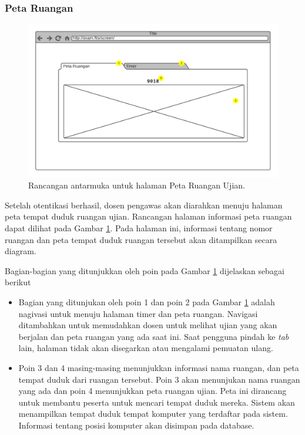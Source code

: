 \subsubsection{Peta Ruangan}
    \begin{figure}
        \centering
        \includegraphics[width=0.7\paperwidth]{Gambar/mockups/Mockup--DosenPengawas - Seatmap.pdf}
        \caption{Rancangan antarmuka untuk halaman Peta Ruangan Ujian.}
        \label{fig:mockup_dosen_seatmap}
    \end{figure}
    Setelah otentikasi berhasil, dosen pengawas akan diarahkan menuju halaman
    peta tempat duduk ruangan ujian. Rancangan halaman informasi peta ruangan
    dapat dilihat pada Gambar \ref{fig:mockup_dosen_seatmap}. Pada halaman ini,
    informasi tentang nomor ruangan dan peta tempat duduk ruangan tersebut akan
    ditampilkan secara diagram.
    
    Bagian-bagian yang ditunjukkan oleh poin pada Gambar
    \ref{fig:mockup_dosen_seatmap} dijelaskan sebagai berikut
    \begin{itemize}
        \item Bagian yang ditunjukan oleh poin 1 dan poin 2 pada Gambar
            \ref{fig:mockup_dosen_seatmap} adalah nagivasi untuk menuju halaman
            timer dan peta ruangan. Navigasi ditambahkan untuk memudahkan dosen
            untuk melihat ujian yang akan berjalan dan peta ruangan yang ada
            saat ini. Saat pengguna pindah ke \textit{tab} lain, halaman tidak
            akan disegarkan atau mengalami pemuatan ulang. 
            
        \item Poin 3 dan 4 masing-masing menunjukkan informasi nama ruangan, dan
            peta tempat duduk dari ruangan tersebut. Poin 3 akan menunjukan nama
            ruangan yang ada dan poin 4 menunjukkan peta ruangan ujian. Peta ini
            dirancang untuk membantu peserta untuk mencari tempat duduk mereka.
            Sistem akan menampilkan tempat duduk tempat komputer yang terdaftar
            pada sistem. Informasi tentang posisi komputer akan disimpan
            pada database.
    \end{itemize}
